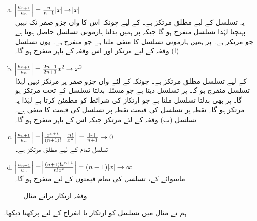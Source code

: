 \begin{enumerate}[a.]
\item
$\abs{\frac{u_{n+1}}{u_n}}=\frac{n}{n+1}\abs{x}\to\abs{x}$\\
 یہ تسلسل  کے لیے مطلق مرتکز ہے۔  کے لیے چونکہ اس کا  واں جزو صفر تک نہیں پہنچتا لہٰذا تسلسل منفرج ہو گا جبکہ  پر ہمیں بدلتا ہارمونی تسلسل  حاصل ہوتا ہے جو مرتکز ہے۔  پر ہمیں ہارمونی تسلسل کا منفی   ملتا ہے جو منفرج ہے۔ یوں تسلسل  (ا) وقفہ  کے لیے مرتکز اور اس وقفہ کے باہر منفرج ہو گا۔
\item
$\abs{\frac{u_{n+1}}{u_n}}=\frac{2n-1}{2n+1}x^2\to x^2$\\
 کے لیے تسلسل مطلق مرتکز ہے۔ چونکہ  کے لئے   واں جزو صفر پر مرتکز نہیں   لہٰذا تسلسل منفرج ہو گا۔  پر تسلسل  دیتا ہے جو مسئلہ بدلتا تسلسل کے تحت مرتکز ہو گا۔  پر بھی بدلتا تسلسل ملتا ہے جو ارتکاز کی شرائط کو مطمئن کرتا ہے لہٰذا یہ مرتکز ہو گا۔ نقطہ  پر تسلسل کی قیمت نقطہ  پر تسلسل کی قیمت کا  منفی  ہے۔ تسلسل (ب) وقفہ   کے لئے مرتکز جبکہ  اس کے باہر منفرج ہو گا۔
\item
$\abs{\frac{u_{n+1}}{u_n}}=\abs{\frac{x^{n+1}}{(n+1)!}\cdot\frac{n!}{x^n}}=\frac{\abs{x}}{n+1}\to 0$\\
تسلسل تمام  کے لیے مطلق مرتکز ہے۔
\item
$\abs{\frac{u_{n+1}}{u_n}}=\abs{\frac{(n+1)!x^{n+1}}{n!x^n}}=(n+1)\abs{x}\to\infty$\\
ماسوائے  کے،  تسلسل  کی تمام قیمتوں کے لیے منفرج ہو گا۔ 
\end{enumerate}
\begin{figure}
\centering
{}
\caption{وقفہ ارتکاز برائے مثال }
\label{شکل_مثال_تسلسل_مرتکز_منفرج_تسلسل}
\end{figure}
ہم نے مثال  میں تسلسل کو ارتکاز یا انفراج کے لیے پرکھنا دیکھا۔ 


